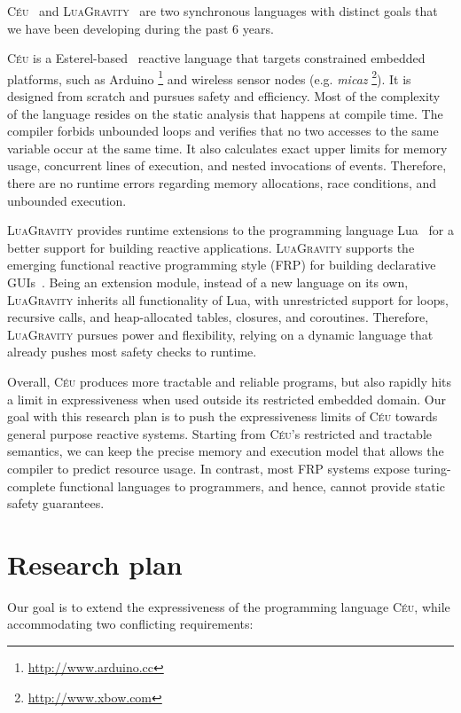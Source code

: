 \documentclass[pdftex,12pt,a4paper]{article}
\newcommand{\CEU}{\textsc{C\'{e}u}\xspace}
\newcommand{\GVT}{\textsc{LuaGravity}\xspace}
\begin{document}
\CEU~\cite{ceu.tr,ceu.phd,ceu.sensys13,ceu.rem13}
and
\GVT~\cite{luagravity.sblp,luagravity.msc}
are two synchronous languages with distinct goals that we have been developing 
during the past 6 years.

\CEU is a Esterel-based~\cite{esterel.ieee91} reactive language that targets 
constrained embedded platforms, such as Arduino%
\footnote{\url{http://www.arduino.cc}}
and wireless sensor nodes (e.g. \emph{micaz}%
\footnote{\url{http://www.xbow.com}}).
It is designed from scratch and pursues safety and efficiency.
Most of the complexity of the language resides on the static analysis that 
happens at compile time.
The compiler forbids unbounded loops and verifies that no two accesses to the 
same variable occur at the same time.
It also calculates exact upper limits for memory usage, concurrent lines of 
execution, and nested invocations of events.
Therefore, there are no runtime errors regarding memory allocations, race 
conditions, and unbounded execution.

\GVT provides runtime extensions to the programming language Lua~\cite{lua.pil} 
for a better support for building reactive applications.
\GVT supports the emerging functional reactive programming style (FRP) for 
building declarative GUIs~\cite{frp.flapjax,frp.elm,frp.survey}.
Being an extension module, instead of a new language on its own, \GVT inherits 
all functionality of Lua, with unrestricted support for loops, recursive calls, 
and heap-allocated tables, closures, and coroutines.
Therefore, \GVT pursues power and flexibility, relying on a dynamic language 
that already pushes most safety checks to runtime.

Overall, \CEU produces more tractable and reliable programs, but also rapidly 
hits a limit in expressiveness when used outside its restricted embedded 
domain.
%
Our goal with this research plan is to push the expressiveness limits of \CEU 
towards general purpose reactive systems.
%
Starting from \CEU's restricted and tractable semantics, we can keep the 
precise memory and execution model that allows the compiler to predict resource 
usage.
%
In contrast, most FRP systems expose turing-complete functional languages to 
programmers, and hence, cannot provide static safety guarantees.

\section{Research plan}

Our goal is to extend the expressiveness of the programming language \CEU, 
while accommodating two conflicting requirements:
\end{document}
